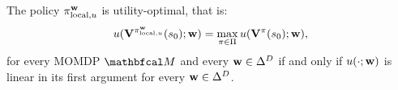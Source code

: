 
    \begin{theorem}
        \label{thm:per-step-linear}
        The policy $\pi^{\mathbf{w}}_{\textnormal{local},u}$ is utility-optimal, that is: 
        \begin{align}
            u(\mathbf{V}^{\pi^{\mathbf{w}}_{\textnormal{local},u}}(s_0); \mathbf{w}) = \max_{\pi\in\Pi} u(\mathbf{V}^{\pi}(s_0); \mathbf{w}),
        \end{align} 
        for every MOMDP $\bfcl{M}$ and every $\mathbf{w} \in \Delta^D$ if and only if $u(\cdot; \mathbf{w})$ is linear in its first argument for every $\mathbf{w} \in \Delta^D$.
    \end{theorem}
